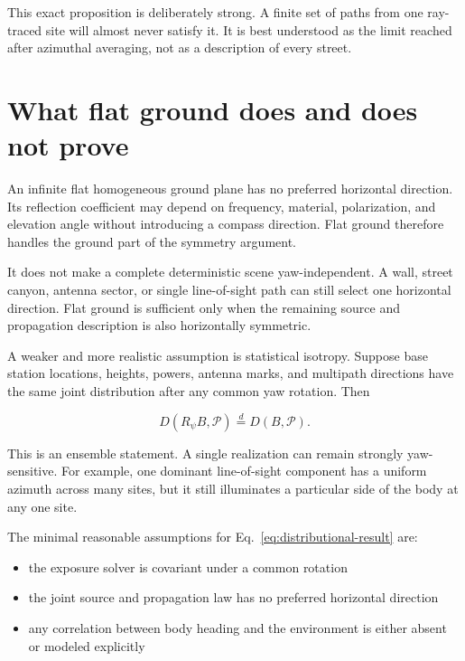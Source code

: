 \documentclass[11pt]{article}
\begin{document}
This exact proposition is deliberately strong. A finite set of paths from one
ray-traced site will almost never satisfy it. It is best understood as the
limit reached after azimuthal averaging, not as a description of every street.

\section{What flat ground does and does not prove}

An infinite flat homogeneous ground plane has no preferred horizontal
direction. Its reflection coefficient may depend on frequency, material,
polarization, and elevation angle without introducing a compass direction.
Flat ground therefore handles the ground part of the symmetry argument.

It does not make a complete deterministic scene yaw-independent. A wall, street
canyon, antenna sector, or single line-of-sight path can still select one
horizontal direction. Flat ground is sufficient only when the remaining source
and propagation description is also horizontally symmetric.

A weaker and more realistic assumption is statistical isotropy. Suppose base
station locations, heights, powers, antenna marks, and multipath directions
have the same joint distribution after any common yaw rotation. Then

\begin{equation}\label{eq:distributional-result}
  D(R_\psi B,\mathcal{P})
  \overset{d}{=}
  D(B,\mathcal{P}).
\end{equation}

This is an ensemble statement. A single realization can remain strongly
yaw-sensitive. For example, one dominant line-of-sight component has a uniform
azimuth across many sites, but it still illuminates a particular side of the
body at any one site.

The minimal reasonable assumptions for Eq.~\eqref{eq:distributional-result}
are:

\begin{itemize}
  \item the exposure solver is covariant under a common rotation

  \item the joint source and propagation law has no preferred horizontal
  direction

  \item any correlation between body heading and the environment is either
  absent or modeled explicitly
\end{itemize}
\end{document}
